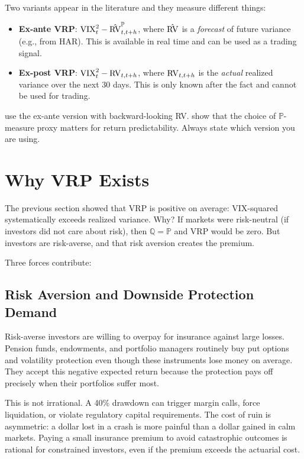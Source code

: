 \begin{warning}
Two variants appear in the literature and they measure different things:
\begin{itemize}[nosep]
  \item \textbf{Ex-ante VRP}: $\text{VIX}^2_t - \hat{\operatorname{RV}}^{\mathbb{P}}_{t,t+h}$, where $\hat{\operatorname{RV}}$ is a \emph{forecast} of future variance (e.g., from HAR). This is available in real time and can be used as a trading signal.
  \item \textbf{Ex-post VRP}: $\text{VIX}^2_t - \operatorname{RV}_{t,t+h}$, where $\operatorname{RV}_{t,t+h}$ is the \emph{actual} realized variance over the next 30 days. This is only known after the fact and cannot be used for trading.
\end{itemize}
\citet{BTZ2009} use the ex-ante version with backward-looking RV.
\citet{BekaertHoerova2014} show that the choice of $\mathbb{P}$-measure proxy matters for return predictability.
Always state which version you are using.
\end{warning}


\section{Why VRP Exists}
\label{sec:vrp-why}

The previous section showed that VRP is positive on average: VIX-squared systematically exceeds realized variance.
Why?
If markets were risk-neutral (if investors did not care about risk), then $\mathbb{Q} = \mathbb{P}$ and VRP would be zero.
But investors are risk-averse, and that risk aversion creates the premium.

Three forces contribute:

\subsection{Risk Aversion and Downside Protection Demand}

Risk-averse investors are willing to overpay for insurance against large losses.
Pension funds, endowments, and portfolio managers routinely buy put options and volatility protection even though these instruments lose money on average.
They accept this negative expected return because the protection pays off precisely when their portfolios suffer most.

This is not irrational.
A 40\% drawdown can trigger margin calls, force liquidation, or violate regulatory capital requirements.
The cost of ruin is asymmetric: a dollar lost in a crash is more painful than a dollar gained in calm markets.
Paying a small insurance premium to avoid catastrophic outcomes is rational for constrained investors, even if the premium exceeds the actuarial cost.

